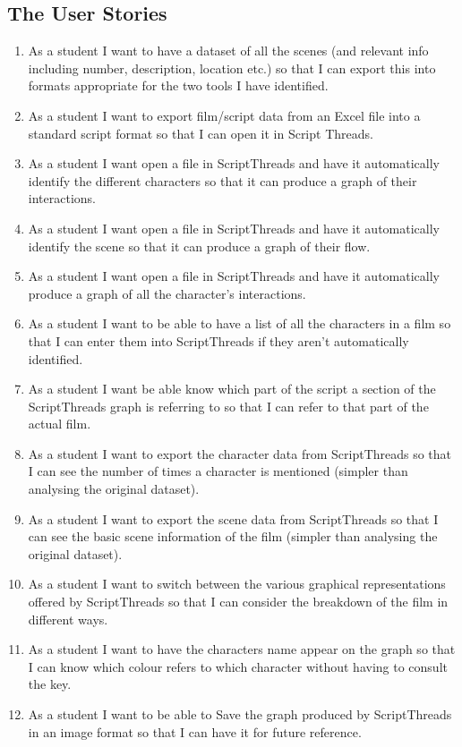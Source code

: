 \documentclass{article}
\begin{document}
\subsection{The User Stories}
\begin{enumerate}
    \item As a student I want to have a dataset of all the scenes (and relevant info including number, description, location etc.) so that I can export this into formats appropriate for the two tools I have identified.
    \item As a student I want to export film/script data from an Excel file into a standard script format so that I can open it in Script Threads.
    \item As a student I want open a file in ScriptThreads and have it automatically identify the different characters so that it can produce a graph of their interactions.
    \item As a student I want open a file in ScriptThreads and have it automatically identify the scene so that it can produce a graph of their flow.
    \item As a student I want open a file in ScriptThreads and have it automatically produce a graph of all the character's interactions.
    \item As a student I want to be able to have a list of all the characters in a film so that I can enter them into ScriptThreads if they aren't automatically identified.
    \item As a student I want be able know which part of the script a section of the ScriptThreads graph is referring to so that I can refer to that part of the actual film.
    \item As a student I want to export the character data from ScriptThreads so that I can see the number of times a character is mentioned (simpler than analysing the original dataset).
    \item As a student I want to export the scene data from ScriptThreads so that I can see the basic scene information of the film (simpler than analysing the original dataset).
    \item As a student I want to switch between the various graphical representations offered by ScriptThreads so that I can consider the breakdown of the film in different ways.
    \item As a student I want to have the characters name appear on the graph so that I can know which colour refers to which character without having to consult the key.
    \item As a student I want to be able to Save the graph produced by ScriptThreads in an image format so that I can have it for future reference.

\end{enumerate}
\end{document}

